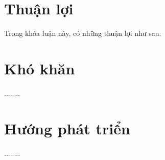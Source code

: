 \documentclass[../main-report.tex]{subfiles}
\begin{document}
\section{Thuận lợi}
Trong khóa luận này, có những thuận lợi như sau:


\section{Khó khăn}
........ 
\section{Hướng phát triển}
........
\end{document}
